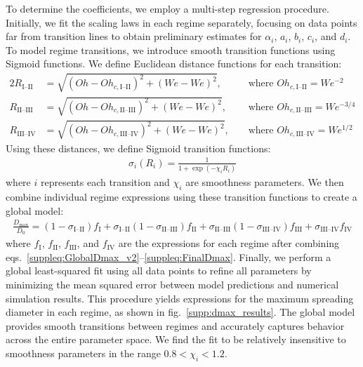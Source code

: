\documentclass[reprint,amssymb,superscriptaddress,aps,prfluids,onecolumn]{revtex4-1}
\begin{document}
To determine the coefficients, we employ a multi-step regression procedure. Initially, we fit the scaling laws in each regime separately, focusing on data points far from transition lines to obtain preliminary estimates for $\alpha_i$, $a_i$, $b_i$, $c_i$, and $d_i$. To model regime transitions, we introduce smooth transition functions using Sigmoid functions. We define Euclidean distance functions for each transition:
\begin{alignat}{2}
	R_\text{I--II}   &= \sqrt{(Oh - Oh_{c,\text{I--II}})^2 + (We - We)^2},   &&\text{ where } Oh_{c,\text{I--II}} = We^{-2} \\
	R_\text{II--III} &= \sqrt{(Oh - Oh_{c,\text{II--III}})^2 + (We - We)^2}, &&\text{ where } Oh_{c,\text{II--III}} = We^{-3/4} \\
	R_\text{III--IV} &= \sqrt{(Oh - Oh_{c,\text{III--IV}})^2 + (We - We)^2}, &&\text{ where } Oh_{c,\text{III--IV}} = We^{1/2}
\end{alignat}
Using these distances, we define Sigmoid transition functions:
\begin{align}
	\sigma_i(R_i) = \frac{1}{1 + \exp(-\chi_i R_i)}
\end{align}
where $i$ represents each transition and $\chi_i$ are smoothness parameters.
We then combine individual regime expressions using these transition functions to create a global model:
\begin{align}
	\frac{D_{\text{max}}}{D_0} = (1-\sigma_\text{I--II})f_\text{I} +
	\sigma_\text{I--II}(1-\sigma_\text{II--III})f_\text{II} +
	\sigma_\text{II--III}(1-\sigma_\text{III--IV})f_\text{III} +
	\sigma_\text{III--IV}f_\text{IV}
\end{align}
where $f_\text{I}$, $f_\text{II}$, $f_\text{III}$, and $f_\text{IV}$ are the expressions for each regime after combining eqs.~\eqref{suppleq:GlobalDmax_v2}--\eqref{suppleq:FinalDmax}.
Finally, we perform a global least-squared fit using all data points to refine all parameters by minimizing the mean squared error between model predictions and numerical simulation results. This procedure yields expressions for the maximum spreading diameter in each regime, as shown in fig.~\ref{supp:dmax_results}. The global model provides smooth transitions between regimes and accurately captures behavior across the entire parameter space. We find the fit to be relatively insensitive to smoothness parameters in the range $0.8 < \chi_i < 1.2$.

	


	
\end{document}
